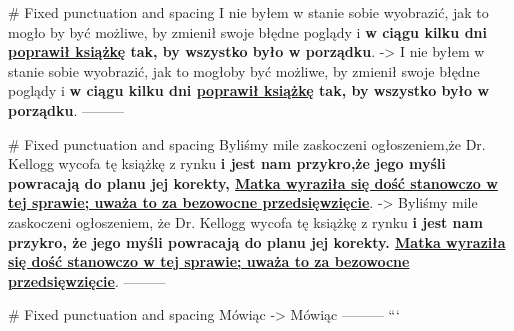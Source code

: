 # Fixed punctuation and spacing
I nie byłem w stanie sobie wyobrazić, jak to mogło by być  możliwe, by zmienił swoje błędne poglądy i \textbf{ w ciągu kilku dni \underline{poprawił książkę} tak, by wszystko było w porządku}.
->
I nie byłem w stanie sobie wyobrazić, jak to mogłoby być możliwe, by zmienił swoje błędne poglądy i \textbf{w ciągu kilku dni \underline{poprawił książkę} tak, by wszystko było w porządku}.
---------

# Fixed punctuation and spacing
Byliśmy mile zaskoczeni ogłoszeniem,że  Dr. Kellogg wycofa tę książkę z rynku  \textbf{i jest nam przykro,że jego myśli powracają do planu jej korekty, \underline{Matka wyraziła się dość stanowczo w tej sprawie; uważa to za bezowocne przedsięwzięcie}}.
->
Byliśmy mile zaskoczeni ogłoszeniem, że Dr. Kellogg wycofa tę książkę z rynku \textbf{i jest nam przykro, że jego myśli powracają do planu jej korekty. \underline{Matka wyraziła się dość stanowczo w tej sprawie; uważa to za bezowocne przedsięwzięcie}}.
---------

# Fixed punctuation and spacing
Mówiąc
->
Mówiąc 
---------
```